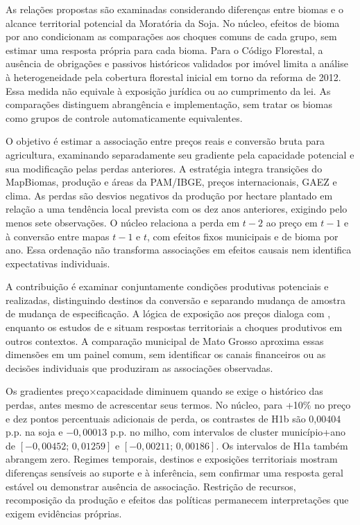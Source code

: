 As relações propostas são examinadas considerando diferenças entre biomas e o alcance territorial potencial da Moratória da Soja. No núcleo, efeitos de bioma por ano condicionam as comparações aos choques comuns de cada grupo, sem estimar uma resposta própria para cada bioma. Para o Código Florestal, a ausência de obrigações e passivos históricos validados por imóvel limita a análise à heterogeneidade pela cobertura florestal inicial em torno da reforma de 2012. Essa medida não equivale à exposição jurídica ou ao cumprimento da lei. As comparações distinguem abrangência e implementação, sem tratar os biomas como grupos de controle automaticamente equivalentes.

O objetivo é estimar a associação entre preços reais e conversão bruta para agricultura, examinando separadamente seu gradiente pela capacidade potencial e sua modificação pelas perdas anteriores. A estratégia integra transições do MapBiomas, produção e áreas da PAM/IBGE, preços internacionais, GAEZ e clima. As perdas são desvios negativos da produção por hectare plantado em relação a uma tendência local prevista com os dez anos anteriores, exigindo pelo menos sete observações. O núcleo relaciona a perda em $t-2$ ao preço em $t-1$ e à conversão entre mapas $t-1$ e $t$, com efeitos fixos municipais e de bioma por ano. Essa ordenação não transforma associações em efeitos causais nem identifica expectativas individuais.

A contribuição é examinar conjuntamente condições produtivas potenciais e realizadas, distinguindo destinos da conversão e separando mudança de amostra de mudança de especificação. A lógica de exposição aos preços dialoga com , enquanto os estudos de  e  situam respostas territoriais a choques produtivos em outros contextos. A comparação municipal de Mato Grosso aproxima essas dimensões em um painel comum, sem identificar os canais financeiros ou as decisões individuais que produziram as associações observadas.

Os gradientes preço×capacidade diminuem quando se exige o histórico das perdas, antes mesmo de acrescentar seus termos. No núcleo, para +10\% no preço e dez pontos percentuais adicionais de perda, os contrastes de H1b são 0,00404 p.p. na soja e $-0,00013$ p.p. no milho, com intervalos de cluster município+ano de $[-0,00452;\,0,01259]$ e $[-0,00211;\,0,00186]$. Os intervalos de H1a também abrangem zero. Regimes temporais, destinos e exposições territoriais mostram diferenças sensíveis ao suporte e à inferência, sem confirmar uma resposta geral estável ou demonstrar ausência de associação. Restrição de recursos, recomposição da produção e efeitos das políticas permanecem interpretações que exigem evidências próprias.

